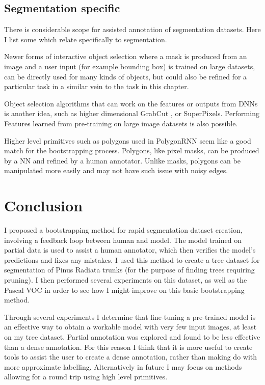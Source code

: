 \subsection{Segmentation specific}

There is considerable scope for assisted annotation of segmentation datasets. Here I list some which relate specifically to segmentation. 

Newer forms of interactive object selection \cite{Xu2016, Xu2017} where a mask is produced from an image and a user input (for example bounding box) is trained on large datasets, can be directly used for many kinds of objects, but could also be refined for a particular task in a similar vein to the task in this chapter.

Object selection algorithms that can work on the features or outputs from \gls{DNN}s is another idea, such as higher dimensional GrabCut \cite{Xu2016a}, or SuperPixels. Performing Features learned from pre-training on large image datasets is also possible.

Higher level primitives such as polygons used in PolygonRNN \cite{Castrejon2017} seem like a good match for the bootstrapping process. Polygons, like pixel masks, can be produced by a \gls{NN} and refined by a human annotator. Unlike masks, polygons can be manipulated more easily and may not have such issue with noisy edges.



\section {Conclusion}

I proposed a bootstrapping method for rapid segmentation dataset creation, involving a feedback loop between human and model. The model trained on partial data is used to assist a human annotator, which then verifies the model's predictions and fixes any mistakes. I used this method to create a tree dataset for segmentation of Pinus Radiata trunks (for the purpose of finding trees requiring pruning). I then performed several experiments on this dataset, as well as the Pascal VOC in order to see how I might improve on this basic bootstrapping method. 

Through several experiments I determine that fine-tuning a pre-trained model is an effective way to obtain a workable model with very few input images, at least on my tree dataset. Partial annotation was explored and found to be less effective than a dense annotation. For this reason I think that it is more useful to create tools to assist the user to create a dense annotation, rather than making do with more approximate labelling. Alternatively in future I may focus on methods allowing for a round trip using high level primitives.



